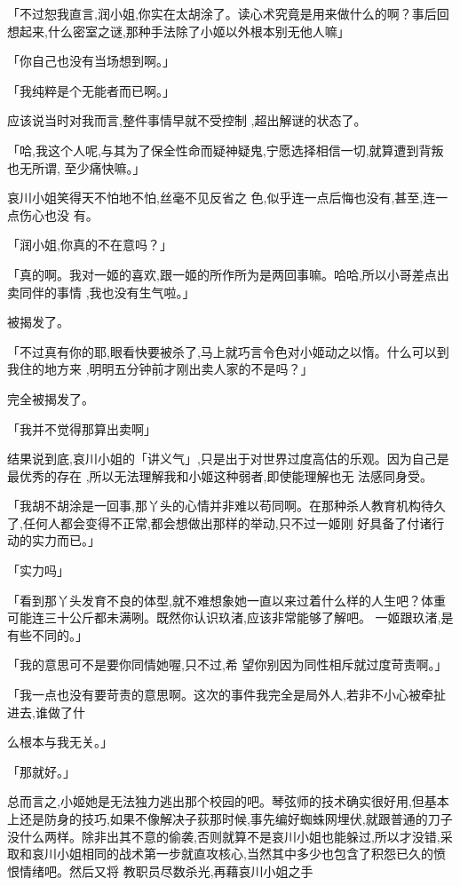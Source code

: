 \documentclass{article}
\begin{document}
「不过恕我直言,润小姐,你实在太胡涂了。读心术究竟是用来做什么的啊？事后回想起来,什么密室之谜,那种手法除了小姬以外根本别无他人嘛」


「你自己也没有当场想到啊。」 


「我纯粹是个无能者而已啊。」 

应该说当时对我而言,整件事情早就不受控制
,超出解谜的状态了。 

「哈,我这个人呢,与其为了保全性命而疑神疑鬼,宁愿选择相信一切,就算遭到背叛也无所谓,
至少痛快嘛。」 

哀川小姐笑得天不怕地不怕,丝毫不见反省之
\newpage
色,似乎连一点后悔也没有,甚至,连一点伤心也没
有。 


「润小姐,你真的不在意吗？」 

「真的啊。我对一姬的喜欢,跟一姬的所作所为是两回事嘛。哈哈,所以小哥差点出卖同伴的事情
,我也没有生气啦。」 


被揭发了。 

「不过真有你的耶,眼看快要被杀了,马上就巧言令色对小姬动之以惰。什么可以到我住的地方来
,明明五分钟前才刚出卖人家的不是吗？」 


完全被揭发了。 


「我并不觉得那算出卖啊」 

结果说到底,哀川小姐的「讲义气」,只是出于对世界过度高估的乐观。因为自己是最优秀的存在
\newpage
,所以无法理解我和小姬这种弱者,即使能理解也无
法感同身受。 

「我胡不胡涂是一回事,那丫头的心情并非难以苟同啊。在那种杀人教育机构待久了,任何人都会变得不正常,都会想做出那样的举动,只不过一姬刚
好具备了付诸行动的实力而已。」 


「实力吗」 

「看到那丫头发育不良的体型,就不难想象她一直以来过着什么样的人生吧？体重可能连三十公斤都未满咧。既然你认识玖渚,应该非常能够了解吧。
一姬跟玖渚,是有些不同的。」 


「我的意思可不是要你同情她喔,只不过,希
望你别因为同性相斥就过度苛责啊。」 

「我一点也没有要苛责的意思啊。这次的事件我完全是局外人,若非不小心被牵扯进去,谁做了什
\newpage

么根本与我无关。」 


「那就好。」 

总而言之,小姬她是无法独力逃出那个校园的吧。琴弦师的技术确实很好用,但基本上还是防身的技巧,如果不像解决子荻那时候,事先编好蜘蛛网埋伏,就跟普通的刀子没什么两样。除非出其不意的偷袭,否则就算不是哀川小姐也能躲过,所以才没错,采取和哀川小姐相同的战术第一步就直攻核心,当然其中多少也包含了积怨已久的愤恨情绪吧。然后又将
教职员尽数杀光,再藉哀川小姐之手 
\end{document}
